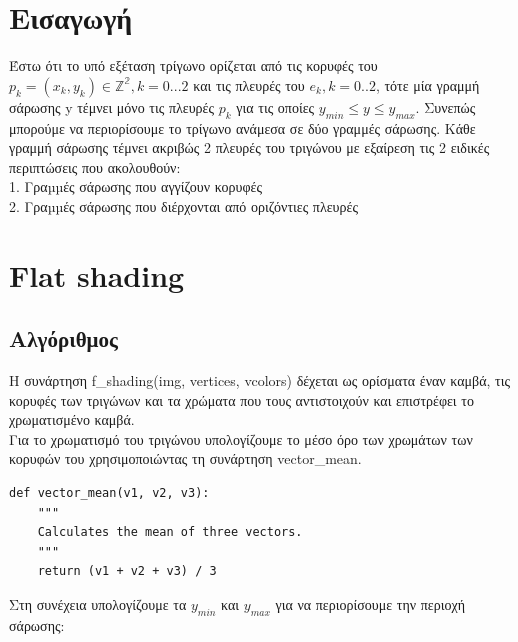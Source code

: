 \documentclass{article}
\title{Εργασία #1: Πλήρωση Τριγώνων}
\author{Βογιατζής Χαρίσιος ΑΕΜ:9192}
\begin{document}
\maketitle

\begin{abstract}
Σκοπός της εργασίας είναι η υλοποίηση αλγορίθμων πλήρωσης τριγώνων με flat shading και texture mapping.\\
Συγκεκριμένα παρουσιάζονται οι: Flat shading και Texture shading καθώς και τα αποτελέσματα που παράγουν.
\end{abstract}

\section{Εισαγωγή}
Έστω ότι το υπό εξέταση τρίγωνο ορίζεται από τις κορυφές του $p_k = (x_k, y_k) \in \mathbb{Z^2} , k = 0...2$ και τις πλευρές του $e_k, k = 0..2$, τότε μία γραμμή σάρωσης y τέμνει μόνο τις πλευρές $p_k$ για τις οποίες $y_{min} \leq y \leq y_{max}$. Συνεπώς μπορούμε να περιορίσουμε το τρίγωνο ανάμεσα σε δύο γραμμές σάρωσης. Κάθε γραμμή σάρωσης τέμνει ακριβώς 2 πλευρές του τριγώνου με εξαίρεση τις 2 ειδικές περιπτώσεις που ακολουθούν: \\
1. Γραµµές σάρωσης που αγγίζουν κορυφές\\
2. Γραµµές σάρωσης που διέρχονται από οριζόντιες πλευρές\\

\section{Flat shading}

\subsection{Αλγόριθμος}
Η συνάρτηση f\_shading(img, vertices, vcolors) δέχεται ως ορίσματα έναν καμβά, τις κορυφές των τριγώνων και τα χρώματα που τους αντιστοιχούν και επιστρέφει το χρωματισμένο καμβά.\\
Για το χρωματισμό του τριγώνου υπολογίζουμε το μέσο όρο των χρωμάτων των κορυφών του χρησιμοποιώντας τη συνάρτηση vector\_mean.

\begin{lstlisting}
def vector_mean(v1, v2, v3):
    """
    Calculates the mean of three vectors.
    """
    return (v1 + v2 + v3) / 3
\end{lstlisting}

Στη συνέχεια υπολογίζουμε τα $y_{min}$ και $y_{max}$ για να περιορίσουμε την περιοχή σάρωσης:
\end{document}
